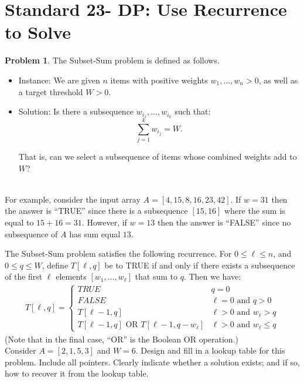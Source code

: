 \documentclass[11pt]{article}
\theoremstyle{definition}
\theoremstyle{definition}
\newtheorem{required}{Problem}
\theoremstyle{definition}
\begin{document}
\section{Standard 23- DP: Use Recurrence to Solve}
\begin{required}
The \textsf{Subset-Sum} problem is defined as follows.
\begin{itemize}
\item \textsf{Instance:} We are given $n$ items with positive weights $w_{1}, \ldots, w_{n} > 0$, as well as a target threshold $W > 0$.  

\item \textsf{Solution:} Is there a subsequence $w_{i_{1}}, \ldots, w_{i_{k}}$ such that:
\[
\sum_{j=1}^{k} w_{i_{j}} = W.
\]

\noindent That is, can we select a subsequence of items whose combined weights add to $W$?
\end{itemize}

\noindent \\ For example, consider the input array $A = [4, 15, 8, 16, 23, 42].$
If $w = 31$ then the answer is ``TRUE'' since there is a subsequence $[15,16]$ where the sum is equal to $15 + 16 = 31$.
However, if $w = 13$ then the answer is ``FALSE'' since no subsequence of $A$ has sum equal $13$.

The \textsf{Subset-Sum} problem satisfies the following recurrence. For $0 \leq \ell \leq n$, and $0 \leq q \leq W$, define $T[\ell,q]$ be to TRUE if and only if there exists a subsequence of the first $\ell$ elements $[w_1,\dotsc,w_\ell]$ that sum to $q$. Then we have:
	\begin{align*}
	T[\ell, q] = 
	\begin{cases}
	TRUE & q=0\\
	FALSE & \ell = 0 \text{ and } q > 0\\
	T[\ell-1, q] & \ell > 0 \text{ and } w_{\ell} > q\\
	T[\ell-1, q] \text{ OR } T[\ell-1, q-w_{\ell}] & \ell > 0 \text{ and } w_\ell \leq q
	\end{cases}
	\end{align*}
(Note that in the final case, ``OR'' is the Boolean OR operation.) \\

\noindent Consider $A = [2, 1, 5, 3]$ and $W = 6$. Design and fill in a lookup table for this problem. Include all pointers. Clearly indicate whether a solution exists; and if so, how to recover it from the lookup table.
\end{required}
\end{document}
